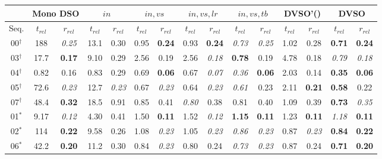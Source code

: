 \documentclass[runningheads]{llncs}
\begin{document}
\begin{table}[tb]
	\centering
	\tiny
	\begin{tabular}{c|cc|cc|cc|cc|cc|cc|cc}
		& \multicolumn{2}{c|}{Mono DSO} & 
		\multicolumn{2}{c|}{$in$} & 
		\multicolumn{2}{c|}{$in,vs$} 
		& 
		\multicolumn{2}{c|}{$in,vs,lr$} & 
		\multicolumn{2}{c|}{$in,vs,tb$}&
		\multicolumn{2}{c|}{DVSO'(\cite{godard2016unsupervised})}&
		\multicolumn{2}{c}{DVSO}\\ 
		\hline
		Seq. & $t_{rel}$ & $r_{rel}$ & $t_{rel}$ & $r_{rel}$ & $t_{rel}$ & 
		$r_{rel}$ & $t_{rel}$ & $r_{rel}$& $t_{rel}$ & $r_{rel}$& $t_{rel}$ & 
		$r_{rel}$& $t_{rel}$ & $r_{rel}$\\
		00$^\dagger$   & 188 & \textit{0.25} & 13.1 & 0.30 & 0.95 & 
		\textbf{0.24} & 0.93 & \textbf{0.24}& 
		\textit{0.73} & \textit{0.25}& 1.02 & 0.28& \textbf{0.71} & 
		\textbf{0.24}
		\\
		03$^\dagger$    & 17.7 & \textbf{0.17} & 9.10 & 0.29 & 2.56 & 0.19 
		&2.56 & \textit{0.18}& \textbf{0.78} & 0.19& 4.78 & 0.18& \textit{0.79} 
		& 
		\textit{0.18}
		\\
		04$^\dagger$    & 0.82 & 0.16 & 0.83 & 0.29 & 0.69 & \textbf{0.06} 
		&0.67 & \textit{0.07}& 
		\textit{0.36} & \textbf{0.06}& 2.03 & 0.14& \textbf{0.35} & 
		\textbf{0.06}
		\\
		05$^\dagger$    & 72.6 & \textit{0.23} & 12.7 & \textit{0.23} & 0.67 & 
		\textit{0.23} &0.64 & \textit{0.23}& 
		\textit{0.61} & 0.23& 2.11 & \textbf{0.21}& \textbf{0.58} & 0.22
		\\
		07$^\dagger$    & 48.4 & \textbf{0.32} & 18.5 & 0.91 & 0.85 & 0.41 & 
		\textit{0.80} & 0.38&0.81 & 0.40& 1.09 & 0.39& \textbf{0.73} & 
		\textit{0.35}
		\\
		\hline
		01$^\ast$   & 9.17 & \textit{0.12} & 4.30 & 0.41 & 1.50 & \textbf{0.11} 
		&1.52 & 
		\textit{0.12}& 
		\textbf{1.15} 
		& \textbf{0.11}& 1.23 & \textbf{0.11}& \textit{1.18} & \textbf{0.11}
		\\
		02$^\ast$   & 114 & \textbf{0.22} & 9.58 & 0.26 & 1.08 & \textit{0.23} 
		&1.05 & 
		\textit{0.23}& \textit{0.86} & \textit{0.23}& 0.87 & \textit{0.23}& 
		\textbf{0.84} & 
		\textbf{0.22}
		\\
		06$^\ast$   & 42.2 & \textbf{0.20} & 11.2 & 0.30 & 0.84 & \textit{0.23} 
		&0.80 & 
		0.24& 
		\textit{0.73} & \textit{0.23}& 0.87 & 0.24& 
		\textbf{0.71} & 
		\textbf{0.20}
		\\

\end{tabular}
\end{table}
\end{document}
